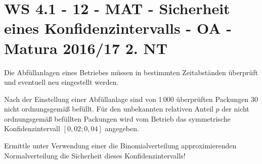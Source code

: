 \section{WS 4.1 - 12 - MAT - Sicherheit eines Konfidenzintervalls - OA - Matura 2016/17 2. NT}

\begin{beispiel}[WS 4.1]{1} %
Die Abfüllanlagen eines Betriebes müssen in bestimmten Zeitabständen überprüft und eventuell neu eingestellt werden.

Nach der Einstellung einer Abfüllanlage sind von 1\,000 überprüften Packungen 30 nicht ordnungsgemäß befüllt. Für den unbekannten relativen Anteil $p$ der nicht ordnungsgemäß befüllten Packungen wird vom Betrieb das symmetrische Konfidenzintervall $[0,02; 0,04]$ angegeben.

Ermittle unter Verwendung einer die Binomialverteilung approximierenden Normalverteilung die Sicherheit dieses Konfidenzintervalls!\leer

\end{beispiel}